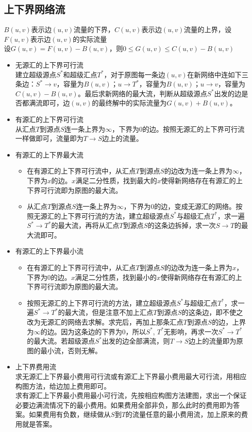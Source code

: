 	\subsection*{上下界网络流}
		$ B(u, v) $表示边$ (u, v) $流量的下界，$ C(u, v) $表示边$ (u, v) $流量的上界，设$ F(u, v) $表示边$ (u, v) $的实际流量\\
		设$ G(u, v) = F(u, v) - B(u, v) $，则$ 0 \leq G(u, v) \leq C(u, v) - B(u, v) $
		\begin{itemize}
			\item 无源汇的上下界可行流
				\\建立超级源点$ S^\ast $和超级汇点$ T^\ast $，对于原图每一条边$ (u, v) $在新网络中连如下三条边：$ S^\ast \to v $，容量为$ B(u, v) $；$ u \to T^\ast $，容量为$ B(u, v) $；$ u \to v $，容量为$ C(u, v) - B(u, v) $。最后求新网络的最大流，判断从超级源点$ S^\ast $出发的边是否都满流即可，边$ (u, v) $的最终解中的实际流量为$ G(u, v) + B(u, v) $。
			\item 有源汇的上下界可行流
				\\从汇点$ T $到源点$ S $连一条上界为$ \infty $，下界为$ 0 $的边。按照无源汇的上下界可行流一样做即可，流量即为$ T \to S $边上的流量。
			\item 有源汇的上下界最大流
				\begin{itemize}
					\item 在有源汇的上下界可行流中，从汇点$ T $到源点$ S $的边改为连一条上界为$ \infty $，下界为$ x $的边。$ x $满足二分性质，找到最大的$ x $使得新网络存在有源汇的上下界可行流即为原图的最大流。
					\item 从汇点$ T $到源点$ S $连一条上界为$ \infty $，下界为$ 0 $的边，变成无源汇的网络。按照无源汇的上下界可行流的方法，建立超级源点$ S^\ast $与超级汇点$ T^\ast $，求一遍$ S^\ast \to T^\ast $的最大流，再将从汇点$ T $到源点$ S $的这条边拆掉，求一次$ S \to T $的最大流即可。
				\end{itemize}
			\item 有源汇的上下界最小流
				\begin{itemize}
					\item 在有源汇的上下界可行流中，从汇点$ T $到源点$ S $的边改为连一条上界为$ x $，下界为$ 0 $的边。$ x $满足二分性质，找到最小的$ x $使得新网络存在有源汇的上下界可行流即为原图的最大流。
					\item 按照无源汇的上下界可行流的方法，建立超级源点$ S^\ast $与超级汇点$ T^\ast $，求一遍$ S^\ast \to T^\ast $的最大流，但是注意不加上汇点$ T $到源点$ S $的这条边，即不使之改为无源汇的网络去求解。求完后，再加上那条汇点$ T $到源点$ S $的边，上界为$ \infty $的边。因为这条边的下界为$ 0 $，所以$ S^\ast $, $ T^\ast $无影响，再求一次$ S^\ast \to T^\ast $的最大流。若超级源点$ S^\ast $出发的边全部满流，则$ T \to S $边上的流量即为原图的最小流，否则无解。
				\end{itemize}
			\item 上下界费用流
				\\求无源汇上下界最小费用可行流或有源汇上下界最小费用最大可行流，用相应构图方法，给边加上费用即可。
				\\求有源汇上下界最小费用最小可行流，先按相应构图方法建图，求出一个保证必要边满流情况下的最小费用。如果费用全部非负，那么此时的费用即为答案。如果费用有负数，继续做从$ S $到$ T $的流量任意的最小费用流，加上原来的费用就是答案。
		\end{itemize}
